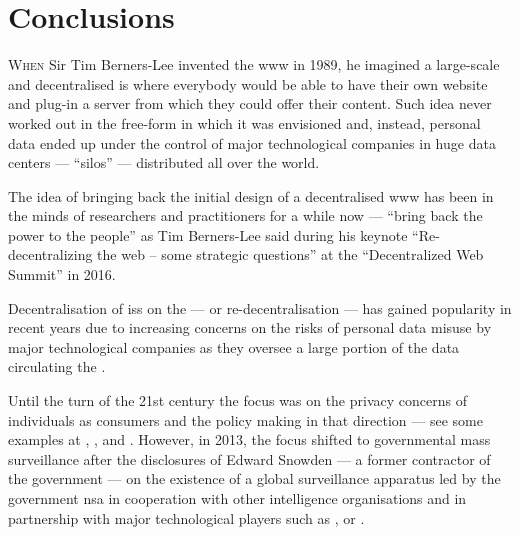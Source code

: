 
\chapter{Conclusions}
    \label{chapter:thesis:conclusions}

\lettrine{\textcolor[gray]{.25}{W}}{hen} Sir Tim Berners-Lee invented the \Ac{www} 
in 1989, he imagined a large-scale and decentralised \ac{is} where everybody would 
be able to have their own website and plug-in a server from which they could offer 
their content. Such idea never worked out in the free-form in which it was envisioned 
and, instead, personal data ended up under the control of major technological companies 
in huge data centers --- ``silos'' --- distributed all over the world.

The idea of bringing back the initial design of a decentralised \ac{www} has been 
in the minds of researchers and practitioners for a while now --- ``bring back the 
power to the people'' as Tim Berners-Lee said during his keynote ``Re-decentralizing 
the web -- some strategic questions'' at the ``Decentralized Web Summit'' in 2016. 

Decentralisation of \acp{is} on the \Internet --- or re-decentralisation --- has 
gained popularity in recent years due to increasing concerns on the risks of personal 
data misuse by major technological companies as they oversee a large portion of 
the data circulating the \Internet.

Until the turn of the 21st century the focus was on the privacy concerns of individuals 
as consumers and the policy making in that direction --- see some examples at \cite{MilbergBSK95}, 
\cite{Rindfleisch97}, \cite{Clarke99} and \cite{NamSPI06}. However, in 2013, the 
focus shifted to governmental mass surveillance after the disclosures of Edward 
Snowden --- a former contractor of the  government --- on the existence 
of a global surveillance apparatus led by the  government \Ac{nsa} in cooperation 
with other intelligence organisations and in partnership with major technological 
players such as \Google, \Facebook or \Apple. 

